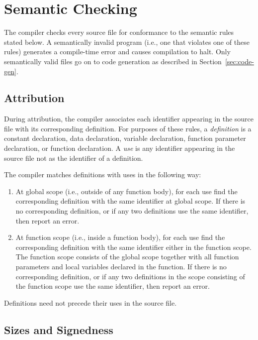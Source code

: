 \documentclass[10pt]{article}
\begin{document}
\section{Semantic Checking}
\label{sec:semantics}

The compiler checks every source file for conformance to the semantic
rules stated below.  A semantically invalid program (i.e., one that
violates one of these rules) generates a compile-time error and causes
compilation to halt.  Only semantically valid files go on to code
generation as described in Section~\ref{sec:code-gen}.

\subsection{Attribution}
\label{sec:semantics:attr}

During attribution, the compiler associates each identifier appearing
in the source file with its corresponding definition.  For purposes of
these rules, a \emph{definition} is a constant declaration, data
declaration, variable declaration, function parameter declaration, or
function declaration.  A \emph{use} is any identifier appearing in the
source file not as the identifier of a definition.

The compiler matches definitions with uses in the following way:
%
\begin{enumerate}
%
\item At global scope (i.e., outside of any function body), for each
  use find the corresponding definition with the same identifier at
  global scope.  If there is no corresponding definition, or if any
  two definitions use the same identifier, then  report an error.
%
\item At function scope (i.e., inside a function body), for each use
  find the corresponding definition with the same identifier either in
  the function scope.  The function scope consists of the global scope
  together with all function parameters and local variables declared
  in the function.  If there is no corresponding definition, or if any
  two definitions in the scope consisting of the function scope use
  the same identifier, then report an error.
%
\end{enumerate}
%
Definitions need not precede their uses in the source file.

\subsection{Sizes and Signedness}
\end{document}
